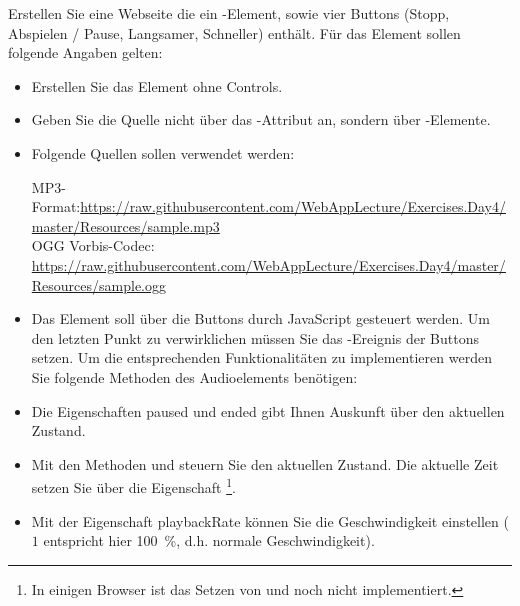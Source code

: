 %
\par Erstellen Sie eine Webseite die ein -Element, sowie vier
Buttons (Stopp, Abspielen / Pause, Langsamer, Schneller) enthält. Für das
Element sollen folgende Angaben gelten:
%
\begin{itemize}
\item
Erstellen Sie das Element ohne Controls.
\item
Geben Sie die Quelle nicht über das -Attribut an, sondern über
-Elemente.
\item
Folgende Quellen sollen verwendet werden:

MP3-Format:\url{https://raw.githubusercontent.com/WebAppLecture/Exercises.Day4/master/Resources/sample.mp3} \\
OGG Vorbis-Codec: \url{https://raw.githubusercontent.com/WebAppLecture/Exercises.Day4/master/Resources/sample.ogg}
\item
Das Element soll über die Buttons durch JavaScript gesteuert werden. Um den
letzten Punkt zu verwirklichen müssen Sie das -Ereignis der
Buttons setzen. Um die entsprechenden Funktionalitäten zu implementieren werden
Sie folgende Methoden des Audioelements benötigen:
\item
Die Eigenschaften paused und ended gibt Ihnen Auskunft über den aktuellen
Zustand.
\item
Mit den Methoden  und  steuern Sie den aktuellen
Zustand. Die aktuelle Zeit setzen Sie über die Eigenschaft
\footnote{In einigen Browser ist das Setzen von
 und  noch nicht implementiert.}.
\item
Mit der Eigenschaft playbackRate können Sie die Geschwindigkeit einstellen
($1$ entspricht hier \qty{100}{\%}, d.h. normale Geschwindigkeit).
\end{itemize}